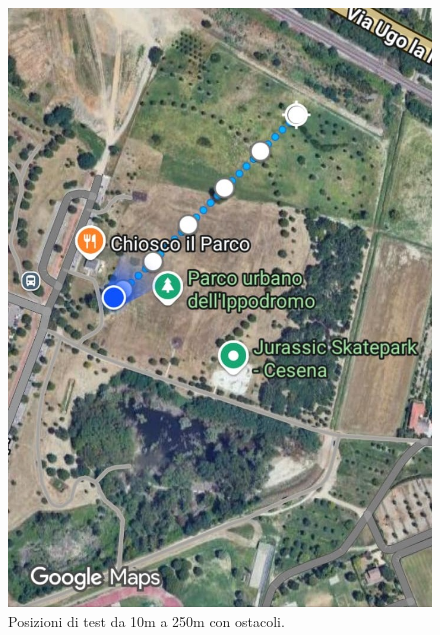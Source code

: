 \documentclass[12pt,a4paper,twoside]{book}
\begin{document}
\begin{figure}[H]
    \centering
    \begin{minipage}{0.32\textwidth}
        \centering
        \includegraphics[width=\textwidth]{img/tests/T1/sat/10-250-full.jpeg}
        \caption{Posizioni di test da 10m a 250m con ostacoli.}
        \label{fig:throughput-test-10-250m-full}
    \end{minipage}
    \hfill
    \begin{minipage}{0.32\textwidth}
        \centering

\end{minipage}
\end{figure}
\end{document}
